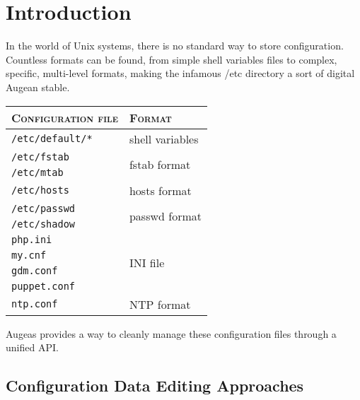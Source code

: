 \cleardoublepage
{}
{}
\chapter*{Introduction}


In the world of Unix systems, there is no standard way to store configuration. Countless formats can be found, from simple shell variables files to complex, specific, multi-level formats, making the infamous /etc directory a sort of digital Augean stable.

\begin{table}
\begin{center}
  \begin{tabular}{l|l}
    \rowcolor{gray!50}
    \textsc{Configuration file} & \textsc{Format} \\
    \hline \hline
    \verb!/etc/default/*! & shell variables \\
    \hline
    \verb!/etc/fstab! & \multirow{2}{*}{fstab format} \\
    \verb!/etc/mtab! &  \\
    \hline
    \verb!/etc/hosts! & hosts format \\
    \hline
    \verb!/etc/passwd! & \multirow{2}{*}{passwd format} \\
    \verb!/etc/shadow! & \\
    \hline
    \verb!php.ini! & \multirow{4}{*}{INI file} \\
    \verb!my.cnf! & \\
    \verb!gdm.conf! &  \\
    \verb!puppet.conf! &  \\
    \hline
    \verb!ntp.conf! & NTP format \\
  \end{tabular}
\end{center}
\end{table}


Augeas provides a way to cleanly manage these configuration files through a unified API.

\section{Configuration Data Editing Approaches}

